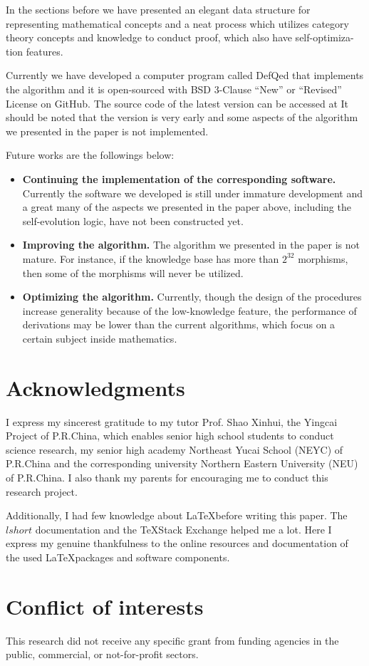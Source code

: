 \documentclass{aims}
\numberwithin{equation}{section}
\numberwithin{theorem}{section}	%
\numberwithin{axiom}{section}	%
\numberwithin{definition}{section}	%
\begin{document}
	In the sections before we have presented an elegant data structure for representing mathematical concepts and a neat process which utilizes category theory concepts and knowledge to conduct proof, which also have self-optimiza-tion features.
	
	Currently we have developed a computer program called DefQed that implements the algorithm and it is open-sourced with BSD 3-Clause {``}New{''} or {``}Revised{''} License on GitHub. The source code of the latest version can be accessed at \cite{Wang2022} It should be noted that the version is very early and some aspects of the algorithm we presented in the paper is not implemented.
	
	Future works are the followings below:
	\begin{itemize}
		\item \textbf{Continuing the implementation of the corresponding software.} Currently the software we developed is still under immature development and a great many of the aspects we presented in the paper above, including the self-evolution logic, have not been constructed yet.
		\item  \textbf{Improving the algorithm.} The algorithm we presented in the paper is not mature. For instance, if the knowledge base has more than \(2^{32}\) morphisms, then some of the morphisms will never be utilized.
		\item \textbf{Optimizing the algorithm.} Currently, though the design of the procedures increase generality because of the low-knowledge feature, the performance of derivations may be lower than the current algorithms, which focus on a certain subject inside mathematics.
	\end{itemize}
	
	\section{Acknowledgments}
	I express my sincerest gratitude to my tutor Prof. Shao Xinhui, the Yingcai Project of P.R.China, which enables senior high school students to conduct science research, my senior high academy Northeast Yucai School (NEYC) of P.R.China and the corresponding university Northern Eastern University (NEU) of P.R.China. I also thank my parents for encouraging me to conduct this research project.
	
	Additionally, I had few knowledge about \LaTeX before writing this paper. The $lshort$ documentation and the \TeX Stack Exchange helped me a lot. Here I express my genuine thankfulness to the online resources and documentation of the used \LaTeX packages and software components. 
	
	\section*{Conflict of interests}
	This research did not receive any specific grant from funding agencies in the public, commercial, or
	not-for-profit sectors.
	
	
	
\end{document}
